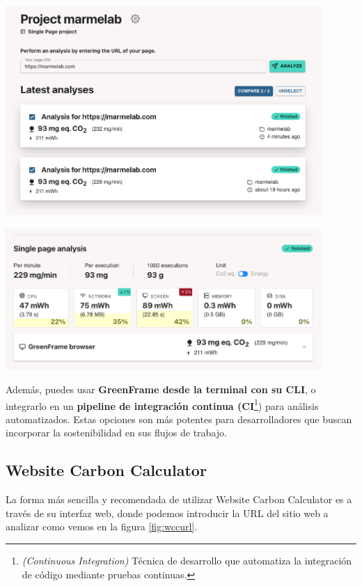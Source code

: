 \documentclass[12pt,a4paper]{report}
\begin{document}
\begin{center}
  \includegraphics[width=0.9\textwidth]{imagenes/Greenframe_7.png}
  \label{fig:greenframecompare}
\end{center}

\begin{center}
  \includegraphics[width=0.9\textwidth]{imagenes/Greenframe_8.png}
  \label{fig:greenframedifference}
\end{center}

Además, puedes usar \textbf{GreenFrame desde la terminal con su CLI}, o
integrarlo en un \textbf{pipeline de integración continua
  (CI}\footnote{\textit{(Continuous Integration)} Técnica de desarrollo que automatiza la
  integración de código mediante pruebas continuas.}) para análisis
automatizados. Estas opciones son más potentes para desarrolladores que buscan
incorporar la sostenibilidad en sus flujos de trabajo.

\subsection{Website Carbon Calculator}
La forma más sencilla y recomendada de utilizar Website Carbon Calculator es a
través de su interfaz web, donde podemos introducir la URL del sitio web a analizar como vemos en la figura \ref{fig:wccurl}.
\end{document}
